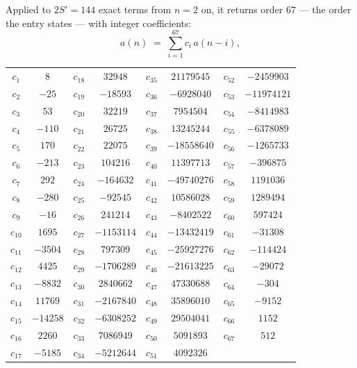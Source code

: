 \documentclass[11pt,a4paper]{article}
\theoremstyle{plain}
\theoremstyle{definition}
\begin{document}
Applied to $2S'=144$ exact terms from $n=2$ on, it returns order $67$ --- the
order the entry states --- with integer coefficients:
\[
a(n)\;=\;\sum_{i=1}^{67}c_i\,a(n-i),
\]
\begin{center}\small
\begin{tabular}{cccccccc}
$c_{1}$ & $8$ & $c_{18}$ & $32948$ & $c_{35}$ & $21179545$ & $c_{52}$ & $-2459903$ \\
$c_{2}$ & $-25$ & $c_{19}$ & $-18593$ & $c_{36}$ & $-6928040$ & $c_{53}$ & $-11974121$ \\
$c_{3}$ & $53$ & $c_{20}$ & $32219$ & $c_{37}$ & $7954504$ & $c_{54}$ & $-8414983$ \\
$c_{4}$ & $-110$ & $c_{21}$ & $26725$ & $c_{38}$ & $13245244$ & $c_{55}$ & $-6378089$ \\
$c_{5}$ & $170$ & $c_{22}$ & $22075$ & $c_{39}$ & $-18558640$ & $c_{56}$ & $-1265733$ \\
$c_{6}$ & $-213$ & $c_{23}$ & $104216$ & $c_{40}$ & $11397713$ & $c_{57}$ & $-396875$ \\
$c_{7}$ & $292$ & $c_{24}$ & $-164632$ & $c_{41}$ & $-49740276$ & $c_{58}$ & $1191036$ \\
$c_{8}$ & $-280$ & $c_{25}$ & $-92545$ & $c_{42}$ & $10586028$ & $c_{59}$ & $1289494$ \\
$c_{9}$ & $-16$ & $c_{26}$ & $241214$ & $c_{43}$ & $-8402522$ & $c_{60}$ & $597424$ \\
$c_{10}$ & $1695$ & $c_{27}$ & $-1153114$ & $c_{44}$ & $-13432419$ & $c_{61}$ & $-31308$ \\
$c_{11}$ & $-3504$ & $c_{28}$ & $797309$ & $c_{45}$ & $-25927276$ & $c_{62}$ & $-114424$ \\
$c_{12}$ & $4425$ & $c_{29}$ & $-1706289$ & $c_{46}$ & $-21613225$ & $c_{63}$ & $-29072$ \\
$c_{13}$ & $-8832$ & $c_{30}$ & $2840662$ & $c_{47}$ & $47330688$ & $c_{64}$ & $-304$ \\
$c_{14}$ & $11769$ & $c_{31}$ & $-2167840$ & $c_{48}$ & $35896010$ & $c_{65}$ & $-9152$ \\
$c_{15}$ & $-14258$ & $c_{32}$ & $-6308252$ & $c_{49}$ & $29504041$ & $c_{66}$ & $1152$ \\
$c_{16}$ & $2260$ & $c_{33}$ & $7086949$ & $c_{50}$ & $5091893$ & $c_{67}$ & $512$ \\
$c_{17}$ & $-5185$ & $c_{34}$ & $-5212644$ & $c_{51}$ & $4092326$ &  &  \\
\end{tabular}
\end{center}
\end{document}
